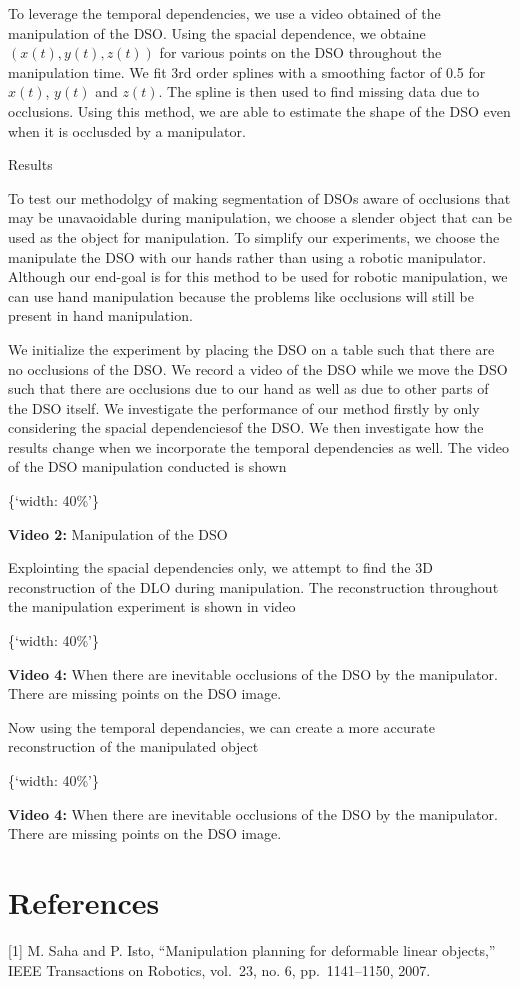 To leverage the temporal dependencies, we use a video obtained of the
manipulation of the DSO. Using the spacial dependence, we obtaine
\((x(t), y(t), z(t))\) for various points on the DSO throughout the
manipulation time. We fit 3rd order splines with a smoothing factor of
0.5 for \(x(t)\), \(y(t)\) and \(z(t)\). The spline is then used to find
missing data due to occlusions. Using this method, we are able to
estimate the shape of the DSO even when it is occlusded by a
manipulator.

Results

To test our methodolgy of making segmentation of DSOs aware of
occlusions that may be unavaoidable during manipulation, we choose a
slender object that can be used as the object for manipulation. To
simplify our experiments, we choose the manipulate the DSO with our
hands rather than using a robotic manipulator. Although our end-goal is
for this method to be used for robotic manipulation, we can use hand
manipulation because the problems like occlusions will still be present
in hand manipulation.

We initialize the experiment by placing the DSO on a table such that
there are no occlusions of the DSO. We record a video of the DSO while
we move the DSO such that there are occlusions due to our hand as well
as due to other parts of the DSO itself. We investigate the performance
of our method firstly by only considering the spacial dependenciesof the
DSO. We then investigate how the results change when we incorporate the
temporal dependencies as well. The video of the DSO manipulation
conducted is shown

\{`width:
40\%'\}

\textbf{Video 2:} Manipulation of the DSO

Explointing the spacial dependencies only, we attempt to find the 3D
reconstruction of the DLO during manipulation. The reconstruction
throughout the manipulation experiment is shown in video

\{`width:
40\%'\}

\textbf{Video 4:} When there are inevitable occlusions of the DSO by the
manipulator. There are missing points on the DSO image.

Now using the temporal dependancies, we can create a more accurate
reconstruction of the manipulated object

\{`width:
40\%'\}

\textbf{Video 4:} When there are inevitable occlusions of the DSO by the
manipulator. There are missing points on the DSO image.

\section{References}\label{references}

{[}1{]} M. Saha and P. Isto, ``Manipulation planning for deformable
linear objects,'' IEEE Transactions on Robotics, vol.~23, no. 6,
pp.~1141--1150, 2007.
